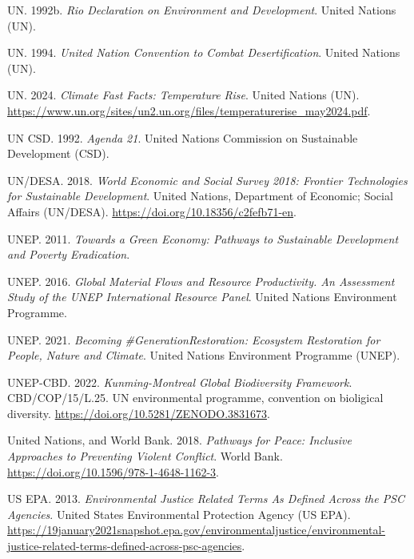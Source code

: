 \documentclass[
  a4paper,
  DIV=11,
  numbers=noendperiod,
  oneside,
  openany]{scrreprt}
\newlength{\cslhangindent}
\newenvironment{CSLReferences}[2] %
 {\begin{list}{}{%
  \setlength{\itemindent}{0pt}
  \setlength{\leftmargin}{0pt}
  \setlength{\parsep}{0pt}
  \ifodd #1
   \setlength{\leftmargin}{\cslhangindent}
   \setlength{\itemindent}{-1\cslhangindent}
  \fi
  \setlength{\itemsep}{#2\baselineskip}}}
 {\end{list}}
\begin{document}
\begin{CSLReferences}{1}{1}
UN. 1992b. \emph{Rio {Declaration} on {Environment} and {Development}}.
United Nations (UN).

UN. 1994. \emph{United {Nation Convention} to {Combat Desertification}}.
United Nations (UN).

UN. 2024. \emph{Climate {Fast} {Facts}: {Temperature} {Rise}}. United
Nations (UN).
\url{https://www.un.org/sites/un2.un.org/files/temperaturerise_may2024.pdf}.

UN CSD. 1992. \emph{Agenda 21}. United Nations Commission on Sustainable
Development (CSD).

UN/DESA. 2018. \emph{World {Economic} and {Social} {Survey} 2018:
{Frontier} {Technologies} for {Sustainable} {Development}}. United
Nations, Department of Economic; Social Affairs (UN/DESA).
\url{https://doi.org/10.18356/c2fefb71-en}.

UNEP. 2011. \emph{Towards a {Green Economy}: {Pathways} to {Sustainable
Development} and {Poverty Eradication}}.

UNEP. 2016. \emph{{Global Material Flows and Resource Productivity. An
Assessment Study of the UNEP International Resource Panel}}. United
Nations Environment Programme.

UNEP. 2021. \emph{Becoming \#{GenerationRestoration}: {Ecosystem}
Restoration for People, Nature and Climate}. United Nations Environment
Programme (UNEP).

UNEP-CBD. 2022. \emph{Kunming-{Montreal Global} Biodiversity Framework}.
CBD/COP/15/L.25. UN environmental programme, convention on bioligical
diversity. \url{https://doi.org/10.5281/ZENODO.3831673}.

United Nations, and World Bank. 2018. \emph{Pathways for {Peace}:
{Inclusive Approaches} to {Preventing Violent Conflict}}. World Bank.
\url{https://doi.org/10.1596/978-1-4648-1162-3}.

US EPA. 2013. \emph{Environmental {Justice} {Related} {Terms} {As}
{Defined} {Across} the {PSC} {Agencies}}. United States Environmental
Protection Agency (US EPA).
\url{https://19january2021snapshot.epa.gov/environmentaljustice/environmental-justice-related-terms-defined-across-psc-agencies}.


\end{CSLReferences}
\end{document}
